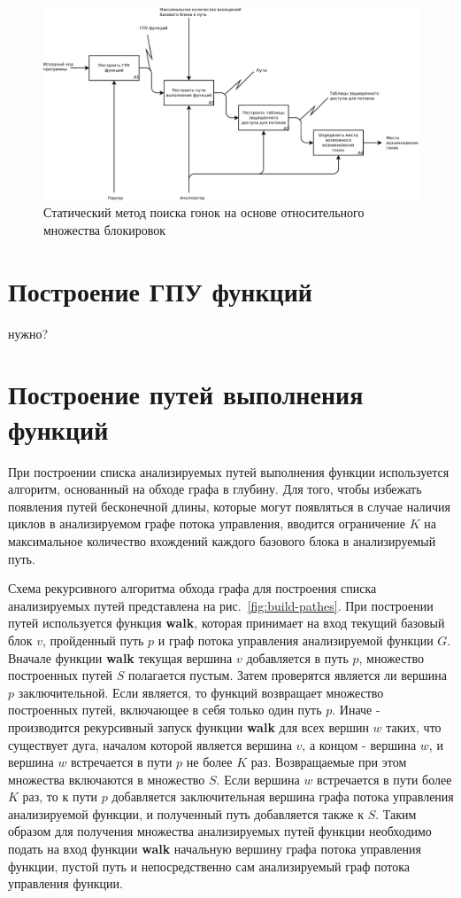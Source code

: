 \begin{figure}
  \centering
  \includegraphics[width=\textwidth]{inc/dia/idef0}
  \caption{Статический метод поиска гонок на основе относительного множества блокировок}
  \label{fig:idef0}
\end{figure}

\section{Построение ГПУ функций}
 нужно?
 
\section{Построение путей выполнения функций}

При построении списка анализируемых путей выполнения функции используется алгоритм, основанный на обходе графа в глубину. Для того, чтобы избежать появления путей бесконечной длины, которые могут появляться в случае наличия циклов в анализируемом графе потока управления, вводится ограничение $K$ на максимальное количество вхождений каждого базового блока в анализируемый путь.

Схема рекурсивного алгоритма обхода графа для построения списка анализируемых путей представлена на рис.~\ref{fig:build-pathes}. При построении путей используется функция \textbf{walk}, которая принимает на вход текущий базовый блок $v$, пройденный путь $p$ и граф потока управления анализируемой функции $G$. Вначале функции \textbf{walk} текущая вершина $v$ добавляется в путь $p$, множество построенных путей $S$ полагается пустым. Затем проверятся является ли вершина $p$ заключительной. Если является, то функций возвращает множество построенных путей, включающее в себя только один путь $p$. Иначе - производится рекурсивный запуск функции \textbf{walk} для всех вершин $w$ таких, что существует дуга, началом которой является вершина $v$, а концом - вершина $w$, и вершина $w$ встречается в пути $p$ не более $K$ раз. Возвращаемые при этом  множества включаются в множество $S$. Если вершина $w$ встречается в пути более $K$ раз, то к пути $p$ добавляется заключительная вершина графа потока управления анализируемой функции, и полученный путь добавляется также к $S$. Таким образом для получения множества анализируемых путей функции необходимо подать на вход функции \textbf{walk} начальную вершину графа потока управления функции, пустой путь и непосредственно сам анализируемый граф потока управления функции.


